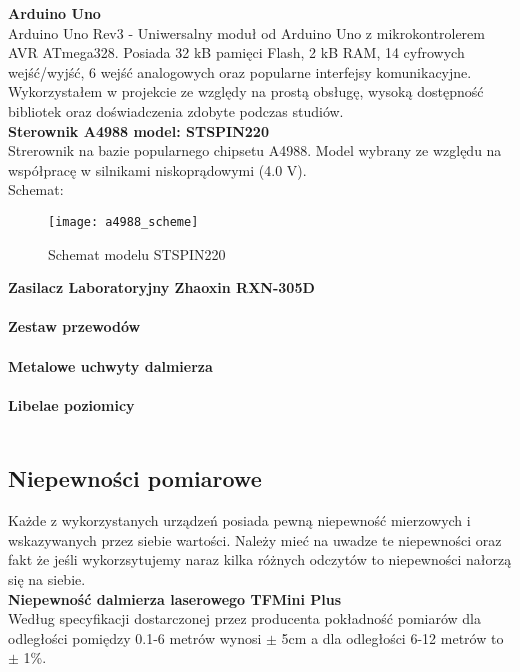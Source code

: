 \textbf{Arduino Uno}\\
Arduino Uno Rev3 - Uniwersalny moduł od Arduino Uno z mikrokontrolerem AVR ATmega328. Posiada 32 kB pamięci Flash, 2 kB RAM, 14 cyfrowych wejść/wyjść, 6 wejść analogowych oraz popularne interfejsy komunikacyjne. Wykorzystałem w projekcie ze względy na prostą obsługę, wysoką dostępność bibliotek oraz doświadczenia zdobyte podczas studiów.\\

\textbf{Sterownik A4988 model: STSPIN220}\\
Strerownik na bazie popularnego chipsetu A4988. Model wybrany ze względu na współpracę w silnikami niskoprądowymi (4.0 V).\\

Schemat:\\
\begin{figure}[h]
    \centering
    \texttt{[image: a4988\_scheme]}
    \caption{Schemat modelu STSPIN220}
    \label{fig:a4988_scheme}
\end{figure}

\textbf{Zasilacz Laboratoryjny Zhaoxin RXN-305D}\\
\\

\textbf{Zestaw przewodów}\\
\\

\textbf{Metalowe uchwyty dalmierza}\\
\\

\textbf{Libelae poziomicy}\\
\\

\subsection {Niepewności pomiarowe}
Każde z wykorzystanych urządzeń posiada pewną niepewność mierzowych i wskazywanych przez siebie wartości. Należy mieć na uwadze te niepewności oraz fakt że jeśli wykorzsytujemy naraz kilka różnych odczytów to niepewności nałorzą się na siebie.\\

\textbf{Niepewność dalmierza laserowego TFMini Plus}\\
Według specyfikacji dostarczonej przez producenta pokładność pomiarów dla odległości pomiędzy 0.1-6 metrów wynosi $\pm$ 5cm a dla odległości 6-12 metrów to $\pm$ 1\%.\\

